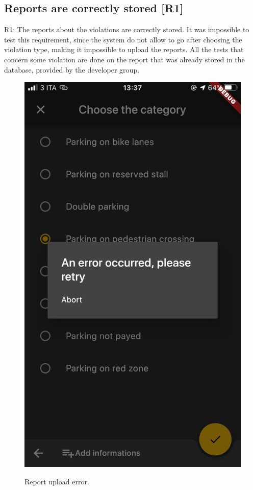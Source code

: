 \documentclass[../ATD.tex]{subfiles}
\begin{document}
    \subsection{Reports are correctly stored [R1]}\label{subsec:report-are-correctly-stored}
    R1: The reports about the violations are correctly stored.
    \newline
    It was impossible to test this requirement, since the system do not allow to go after choosing the violation type, making it impossible to upload the reports.
    All the tests that concern some violation are done on the report that was already stored in the database, provided by the developer group.
    \begin{figure}[H]
        \centering
        \includegraphics[scale = 0.3]{assets/report_upload_error.png}\\
        \caption[Report upload error]{Report upload error.}
    \end{figure}
\end{document}
